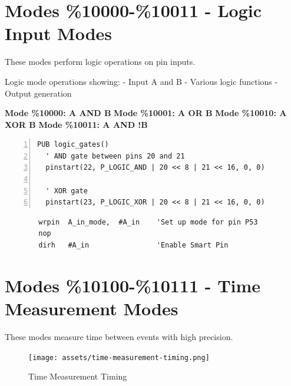 \documentclass[11pt,a4paper,oneside,english]{book}
\begin{document}
\clearpage

\hypertarget{modes-10000-10011---logic-input-modes}{%
\section{Modes \%10000-\%10011 - Logic Input
Modes}\label{modes-10000-10011---logic-input-modes}}

These modes perform logic operations on pin inputs.

Logic mode operations showing: - Input A and B - Various logic functions
- Output generation

\textbf{Mode \%10000: A AND B} \textbf{Mode \%10001: A OR B}
\textbf{Mode \%10010: A XOR B} \textbf{Mode \%10011: A AND !B}

\begin{Spin2Block}
\begin{Verbatim}[numbers=left,numbersep=5pt,xleftmargin=15pt]
PUB logic_gates()
  ' AND gate between pins 20 and 21
  pinstart(22, P_LOGIC_AND | 20 << 8 | 21 << 16, 0, 0)
  
  ' XOR gate
  pinstart(23, P_LOGIC_XOR | 20 << 8 | 21 << 16, 0, 0)
\end{Verbatim}
\end{Spin2Block}

\begin{PASM2Block}
\begin{lstlisting}
        wrpin  A_in_mode,  #A_in    'Set up mode for pin P53
        nop
        dirh   #A_in                'Enable Smart Pin
\end{lstlisting}
\end{PASM2Block}

\clearpage

\hypertarget{modes-10100-10111---time-measurement-modes}{%
\section{Modes \%10100-\%10111 - Time Measurement
Modes}\label{modes-10100-10111---time-measurement-modes}}

These modes measure time between events with high precision.

\begin{figure}
\centering
\texttt{[image: assets/time-measurement-timing.png]}
\caption{Time Measurement Timing}
\end{figure}
\end{document}
